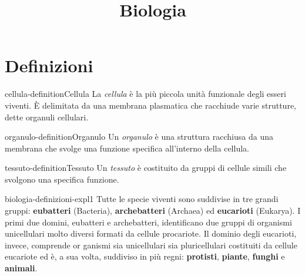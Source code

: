 \documentclass[preview]{standalone}
\begin{document}
\title{Biologia}
\genpage

\section{Definizioni}

\begin{snippetdefinition}{cellula-definition}{Cellula}
    La \textit{cellula} è la più piccola unità funzionale degli esseri
    viventi. È delimitata da una membrana plasmatica
    che racchiude varie strutture, dette organuli cellulari.
\end{snippetdefinition}

\begin{snippetdefinition}{organulo-definition}{Organulo}
    Un \textit{organulo} è una struttura racchiusa da una membrana che svolge
    una funzione specifica all'interno della cellula.
\end{snippetdefinition}

\begin{snippetdefinition}{tessuto-definition}{Tessuto}
    Un \textit{tessuto} è costituito da gruppi
    di cellule simili che svolgono
    una specifica funzione.
\end{snippetdefinition}

\begin{snippet}{biologia-definizioni-expl1}
Tutte le specie viventi sono suddivise in tre grandi gruppi:
\textbf{eubatteri} (Bacteria), \textbf{archebatteri} (Archaea)
ed \textbf{eucarioti} (Eukarya).
I primi due domini, eubatteri e archebatteri, identificano due gruppi di organismi
unicellulari molto diversi formati da cellule
procariote.
Il dominio degli eucarioti, invece, comprende or ganismi sia unicellulari
sia pluricellulari costituiti da cellule eucariote ed è,
a sua volta, suddiviso in più regni: \textbf{protisti},
\textbf{piante}, \textbf{funghi} e \textbf{animali}.
\end{snippet}
\end{document}
